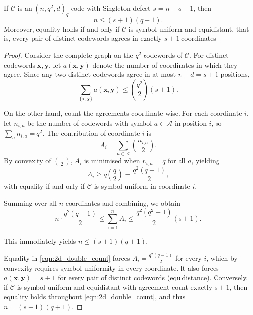 \documentclass[10pt,a4paper]{amsart}
\newcommand{\A}{{\mathcal{A}}}
\begin{document}
	\begin{lemma}\label{lem:2d_bound}
		If $\mathcal{C}$ is an $(n, q^2, d)_q$ code with Singleton defect 	$s = n - d - 1$, then
		\[
		n \le (s+1)(q+1).
		\]
		Moreover, equality holds if and only if $\mathcal{C}$ is symbol-uniform and equidistant, that is, every pair of distinct codewords agrees in
		exactly $s+1$ coordinates.
	\end{lemma}

	\begin{proof}
		Consider the complete graph on the $q^2$ codewords of $\mathcal{C}$. For distinct codewords $\mathbf{x}, \mathbf{y}$, let $a(\mathbf{x},\mathbf{y})$ denote the number of coordinates in which they agree. Since any two distinct codewords agree in at most $n-d = s+1$ positions,
		\[
		\sum_{\{\mathbf{x},\mathbf{y}\}} a(\mathbf{x},\mathbf{y}) \le \binom{q^2}{2}(s+1).
		\]
		
		On the other hand, count the agreements coordinate-wise. For each coordinate $i$, let $n_{i,a}$ be the number of codewords with symbol $a\in\A$ in position $i$, so $\sum_a n_{i,a}=q^2$. The contribution of coordinate $i$ is
		\[
		A_i = \sum_{a\in\A} \binom{n_{i,a}}{2}.
		\]
		By convexity of $\binom{\cdot}{2}$, $A_i$ is minimised when $n_{i,a}=q$ for all $a$, yielding
		\[
		A_i \ge q\binom{q}{2} = \frac{q^2(q-1)}{2},
		\]
		with equality if and only if $\mathcal{C}$ is symbol-uniform in coordinate $i$.
		
		Summing over all $n$ coordinates and combining, we obtain
		\begin{equation}\label{eqn:2d_double_count}
			n \cdot \frac{q^2(q-1)}{2} \le \sum_{i=1}^n A_i \le \frac{q^2(q^2-1)}{2}(s+1).
		\end{equation}
		
		This immediately yields $n \le (s+1)(q+1)$.
		
		Equality in \eqref{eqn:2d_double_count} forces $A_i = \frac{q^2(q-1)}{2}$ for every $i$, which by convexity requires symbol-uniformity in every coordinate. It also forces $a(\mathbf{x},\mathbf{y}) = s+1$ for every pair of distinct codewords (equidistance). Conversely, if $\mathcal{C}$ is symbol-uniform and equidistant with agreement count exactly $s+1$, then equality holds throughout \eqref{eqn:2d_double_count}, and thus $n = (s+1)(q+1)$.
	\end{proof}
\end{document}
